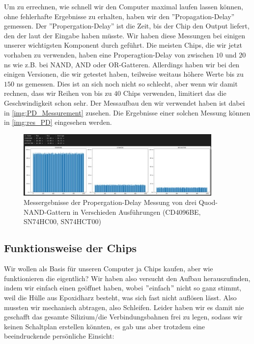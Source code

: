 \documentclass{scrartcl}
\begin{document}
    Um zu errechnen, wie schnell wir den Computer maximal laufen lassen können, ohne fehlerhafte Ergebnisse zu erhalten, haben wir den ''Propagation-Delay'' gemessen.
    Der ''Propergation-Delay'' ist die Zeit, bis der Chip den Output liefert, den der laut der Eingabe haben müsste. Wir haben diese Messungen bei einigen unserer wichtigsten Komponent durch geführt.
    Die meisten Chips, die wir jetzt vorhaben zu verwenden, haben eine Properagtion-Delay von zwischen $10$ und $20$ ns wie z.B. bei NAND, AND oder OR-Gatteren.
    Allerdings haben wir bei den einigen Versionen, die wir getestet haben, teilweise weitaus höhere Werte bis zu $150$ ns gemessen.
    Dies ist an sich noch nicht so schlecht, aber wenn wir damit rechnen, dass wir Reihen von bis zu $40$ Chips verwenden, limitiert das die Geschwindigkeit schon sehr. Der Messaufbau den wir verwendet haben ist dabei in \autoref{img:PD_Messurement} zusehen. Die Ergebnisse einer solchen Messung können in \autoref{img:res_PD} eingesehen werden.

    \begin{figure}
        \includegraphics[width=0.9\textwidth]{NANDs_Result_Rising}
        \caption{Messergebnisse der Propergation-Delay Messung von drei Quod-NAND-Gattern in Verschieden Ausführungen (CD4096BE, SN74HC00, SN74HCT00)\label{img:res_PD}}
    \end{figure}

    \newpage
    \subsection{Funktionsweise der Chips}
    \vspace{-15pt}
    Wir wollen als Basis für unseren Computer ja Chips kaufen, aber wie funktionieren die eigentlich?
    Wir haben also versucht den Aufbau herauszufinden, indem wir einfach einen geöffnet haben, wobei $"$einfach$"$ nicht so ganz stimmt, weil die Hülle aus Epoxidharz besteht, was sich fast nicht auflösen lässt.
    Also mussten wir mechanisch abtragen, also Schleifen.
    Leider haben wir es damit nie geschafft das gesamte Silizium/die Verbindungsbahnen frei zu legen, sodass wir keinen Schaltplan erstellen könnten,
    es gab uns aber trotzdem eine beeindruckende persönliche Einsicht:
\end{document}
